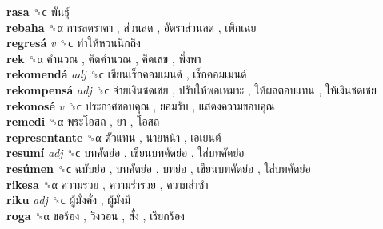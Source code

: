 \textbf{rasa} ␝ϲ   พันธุ์   \\
\textbf{rebaha} ␝α   การลดราคา ,  ส่วนลด ,  อัตราส่วนลด ,  เพิกเฉย   \\
\textbf{regresá} \emph{v}  ␝ϲ   ทำให้หวนนึกถึง   \\
\textbf{rek} ␝α   คำนวณ ,  คิดคำนวณ ,  คิดเลข ,  พึ่งพา   \\
\textbf{rekomendá} \emph{adj}  ␝ϲ   เขียนเร็กคอมเมนด์ ,  เร็กคอมเมนด์   \\
\textbf{rekompensá} \emph{adj}  ␝ϲ   จ่ายเงินชดเชย ,  ปรับให้พอเหมาะ ,  ให้ผลตอบแทน ,  ให้เงินชดเชย   \\
\textbf{rekonosé} \emph{v}  ␝ϲ   ประกาศขอบคุณ ,  ยอมรับ ,  แสดงความขอบคุณ   \\
\textbf{remedi} ␝α   พระโอสถ ,  ยา ,  โอสถ   \\
\textbf{representante} ␝α   ตัวแทน ,  นายหน้า ,  เอเยนต์   \\
\textbf{resumí} \emph{adj}  ␝ϲ   บทคัดย่อ ,  เขียนบทคัดย่อ ,  ใส่บทคัดย่อ   \\
\textbf{resúmen} ␝ϲ   ฉบับย่อ ,  บทคัดย่อ ,  บทย่อ ,  เขียนบทคัดย่อ ,  ใส่บทคัดย่อ   \\
\textbf{rikesa} ␝α   ความรวย ,  ความร่ำรวย ,  ความล่ำซำ   \\
\textbf{riku} \emph{adj}  ␝ϲ   ผู้มั่งคั่ง ,  ผู้มั่งมี   \\
\textbf{roga} ␝α   ขอร้อง ,  วิงวอน ,  สั่ง ,  เรียกร้อง   \\
